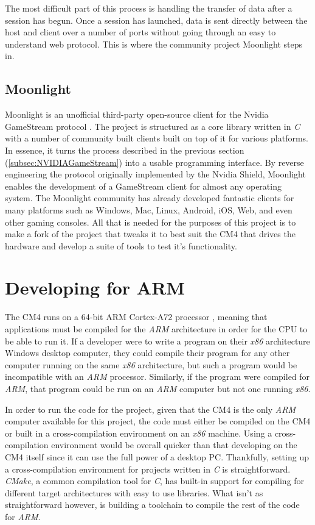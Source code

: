 The most difficult part of this process is handling the transfer of data after a session has begun.
Once a session has launched, data is sent directly between the host and client over a number of ports without going through an easy to understand web protocol.
This is where the community project Moonlight steps in.

\subsection{Moonlight}\label{subsec:Moonlight}

Moonlight is an unofficial third-party open-source client for the Nvidia GameStream protocol \cite{moonlight}.
The project is structured as a core library written in \emph{C} with a number of community built clients built on top of it for various platforms.
In essence, it turns the process described in the previous section (\ref{subsec:NVIDIAGameStream}) into a usable programming interface.
By reverse engineering the protocol originally implemented by the Nvidia Shield, Moonlight enables the development of a GameStream client for almost any operating system.
The Moonlight community has already developed fantastic clients for many platforms such as Windows, Mac, Linux, Android, iOS, Web, and even other gaming consoles.
All that is needed for the purposes of this project is to make a fork of the project that tweaks it to best suit the CM4 that drives the hardware and develop a suite of tools to test it's functionality.


\section{Developing for ARM}\label{sec:DevelopingForARM}

The CM4 runs on a 64-bit ARM Cortex-A72 processor \cite{rpi_cm4}, meaning that applications must be compiled for the \emph{ARM} architecture in order for the CPU to be able to run it.
If a developer were to write a program on their \emph{x86} architecture Windows desktop computer, they could compile their program for any other computer running on the same \emph{x86} architecture, but such a program would be incompatible with an \emph{ARM} processor.
Similarly, if the program were compiled for \emph{ARM}, that program could be run on an \emph{ARM} computer but not one running \emph{x86}.

In order to run the code for the project, given that the CM4 is the only \emph{ARM} computer available for this project, the code must either be compiled on the CM4 or built in a cross-compilation environment on an \emph{x86} machine.
Using a cross-compilation environment would be overall quicker than that developing on the CM4 itself since it can use the full power of a desktop PC.
Thankfully, setting up a cross-compilation environment for projects written in \emph{C} is straightforward.
\emph{CMake}, a common compilation tool for \emph{C}, has built-in support for compiling for different target architectures with easy to use libraries.
What isn't as straightforward however, is building a toolchain to compile the rest of the code for \emph{ARM}.

